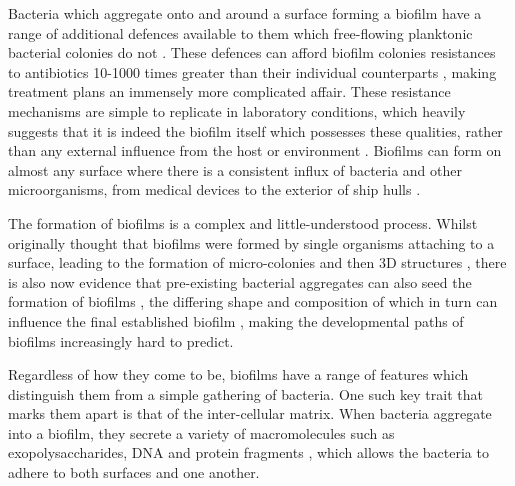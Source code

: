 \documentclass[a4paper,12pt]{article}
\begin{document}

Bacteria which aggregate onto and around a surface forming a biofilm have a range of additional defences available to them which free-flowing planktonic bacterial 
colonies do not \cite{bioref:Lewis-biofilm-riddle-2001}.  These defences can afford biofilm colonies resistances to antibiotics 10-1000 times greater than their individual counterparts 
\cite{bioref:Anderson-innate-biofilm-resistances-2008}, making treatment plans an immensely more complicated affair.  These resistance mechanisms are simple to replicate in laboratory 
conditions, which heavily suggests that it is indeed the biofilm itself which possesses these qualities, rather than any external influence from the host or environment 
\cite{bioref:Stewart-biofilm-resis-mechanisms-2002}.  Biofilms can form on almost any surface where there is a consistent influx of bacteria and other microorganisms, from medical 
devices \cite{bioref:Donlan-biofilms-medical-devices-2002} to the exterior of ship hulls \cite{bioref:Chambers-modern-antifoul-coatings-2006}.  

The formation of biofilms is a complex and little-understood process.  Whilst originally thought that biofilms were formed by single organisms attaching to a surface, leading to 
the formation of micro-colonies and then 3D structures \cite{bioref:Monds-biofilm-formation-2009}, there is also now evidence that pre-existing bacterial aggregates can also 
seed the formation of biofilms \cite{bioref:hall-stooley-biofilm-clumps-2005}, the differing shape and composition of which in turn can influence the final established biofilm 
\cite{bioref:Xavier-biofilm-framework-multiD-modelling-2005}, making the developmental paths of biofilms increasingly hard to predict.

Regardless of how they come to be, biofilms have a range of features which distinguish them from a simple gathering of bacteria. One such key trait that marks them apart is that of the 
inter-cellular matrix.  When bacteria aggregate into a biofilm, they secrete a variety of macromolecules such as exopolysaccharides, DNA and protein fragments 
\cite{bioref:Whitechurch-biomatrix-components-2002}, which allows the bacteria to adhere to both surfaces and one another.
\end{document}
